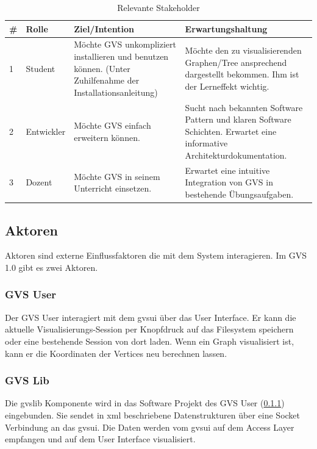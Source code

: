 \documentclass[11pt,a4paper,english,oneside]{book}
\numberwithin{equation}{chapter}
\begin{document}
	\begin{table}[h!]
		\centering
		\begin{tabularx}{\linewidth}{l l X X}
			\toprule 
			\# & Rolle & Ziel/Intention & Erwartungshaltung \\
			\midrule
			1 & Student & Möchte GVS unkompliziert installieren und benutzen können. (Unter Zuhilfenahme der Installationsanleitung) & Möchte den zu visualisierenden Graphen/Tree ansprechend dargestellt bekommen. Ihm ist der Lerneffekt wichtig.  \\
			2 & Entwickler & Möchte GVS einfach erweitern können. & Sucht nach bekannten Software Pattern und klaren Software Schichten. Erwartet eine informative Architekturdokumentation. \\			
			3 & Dozent & Möchte GVS in seinem Unterricht einsetzen. & Erwartet eine intuitive Integration von GVS in bestehende Übungsaufgaben. \\
			\bottomrule 
		\end{tabularx} 
		\caption{Relevante Stakeholder} 
	\end{table}

	\subsection{Aktoren} \label{ssec:actors}
	Aktoren sind externe Einflussfaktoren die mit dem System interagieren. Im GVS 1.0 gibt es zwei Aktoren.
	
	\subsubsection{GVS User} \label{sssec:actor-user}
	Der GVS User interagiert mit dem \gls{gvsui} über das User Interface. Er kann die aktuelle Visualisierungs-Session per Knopfdruck auf das Filesystem speichern oder eine bestehende Session von dort laden. Wenn ein Graph visualisiert ist, kann er die Koordinaten der Vertices neu berechnen lassen.
	
	\subsubsection{GVS Lib} \label{sssec:actor-lib}
	Die \gls{gvslib} Komponente wird in das Software Projekt des GVS User (\ref{sssec:actor-user}) eingebunden. Sie sendet in \gls{xml} beschriebene Datenstrukturen über eine Socket Verbindung an das \gls{gvsui}. Die Daten werden vom \gls{gvsui} auf dem Access Layer empfangen und auf dem User Interface visualisiert.
	
\end{document}
